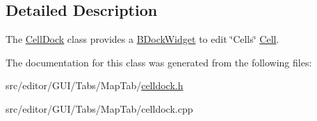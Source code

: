 \subsection{\-Detailed \-Description}
\-The \hyperlink{class_cell_dock}{\-Cell\-Dock} class provides a \hyperlink{class_b_dock_widget}{\-B\-Dock\-Widget} to edit \char`\"{}\-Cells\char`\"{} \hyperlink{class_cell}{\-Cell}. 

\-The documentation for this class was generated from the following files\-:\begin{DoxyCompactItemize}
\item 
src/editor/\-G\-U\-I/\-Tabs/\-Map\-Tab/\hyperlink{celldock_8h}{celldock.\-h}\item 
src/editor/\-G\-U\-I/\-Tabs/\-Map\-Tab/celldock.\-cpp\end{DoxyCompactItemize}
